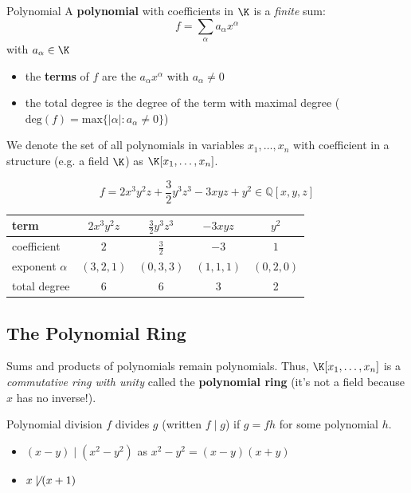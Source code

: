 \documentclass[a4paper, 11pt]{report}
\begin{document}
\begin{defframe}{Polynomial}{}
    A \textbf{polynomial} with coefficients in $\K$ is a \textit{finite} sum:
    $$
f = \sum_{\alpha} a_{\alpha} x^{\alpha}
    $$
    with $a_{\alpha} \in \K$

    \begin{itemize}
        \item the \textbf{terms} of $f$ are the $a_{\alpha} x^{\alpha}$ with $a_{\alpha} \neq 0$
        \item the total degree is the degree of the term with maximal degree ($\text{deg}(f) = \text{max}\{|\alpha| : a_{\alpha} \neq 0\}$)
    \end{itemize}

    We denote the set of all polynomials in variables $x_{1}, \dots, x_{n}$ with coefficient in a structure (e.g. a field $\K$) as $\K[x_{1}, \dots, x_{n}]$.
\end{defframe}

$$
f = 2x^3y^2z + \frac{3}{2}y^3z^3 - 3xyz + y^2 \in \mathbb{Q}[x, y, z]
$$

\begin{center}
 {\small
\renewcommand{\arraystretch}{1.5}
\begin{tabular}{lcccc}
\hline
term & $2x^3y^2z$ & $\frac{3}{2}y^3z^3$ & $-3xyz$ & $y^2$ \\
\hline
coefficient & $2$ & $\frac{3}{2}$ & $-3$ & $1$ \\
exponent $\alpha$ & $(3, 2, 1)$ & $(0, 3, 3)$ & $(1, 1, 1)$ & $(0, 2, 0)$ \\
total degree & 6 & 6 & 3 & 2 \\
\hline
\end{tabular}
}
\end{center}

\subsection{The Polynomial Ring}
Sums and products of polynomials remain polynomials. Thus, $\K[x_{1}, \dots, x_{n}]$ is a \textit{commutative ring with unity} called the \textbf{polynomial ring} (it's not a field because $x$ has no inverse!).

\begin{defframe}{Polynomial division}{}
    $f$ divides $g$ (written $f\mid g$) if $g = f h$ for some polynomial $h$.
\end{defframe}

\begin{itemize}
    \item $(x-y) \mid (x^{2}-y^{2})$ as $x^{2} - y^{2}= (x-y)(x+y)$
    \item $x \not \mid (x+1)$
\end{itemize}
\end{document}
